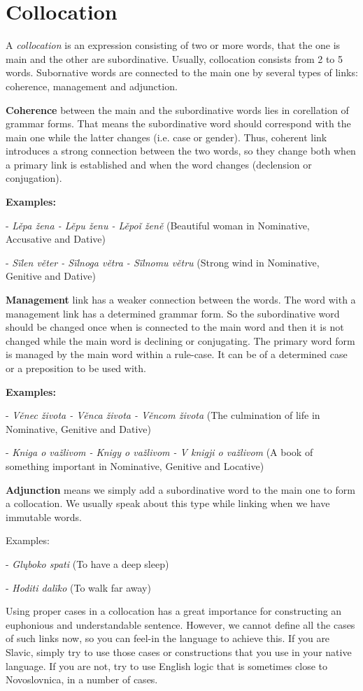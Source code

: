 \section{Collocation}

A \textit{collocation} is an expression consisting of two or more words, that the one is main and the other are subordinative. Usually, collocation consists from 2 to 5 words. Subornative words are connected to the main one by several types of links: coherence, management and adjunction.

\textbf{Coherence} between the main and the subordinative words lies in corellation of grammar forms. That means the subordinative word should correspond with the main one while the latter changes (i.e. case or gender). Thus, coherent link introduces a strong connection between the two words, so they change both when a primary link is established and when the word changes (declension or conjugation).

\textbf{Examples:}

- \textit{Lěpa žena - Lěpu ženu - Lěpoǐ ženě} (Beautiful woman in Nominative, Accusative and Dative)

- \textit{Sïlen věter - Sïlnoga větra - Sïlnomu větru} (Strong wind in Nominative, Genitive and Dative)

\textbf{Management} link has a weaker connection between the words. The word with a management link has a determined grammar form. So the subordinative word should be changed once when is connected to the main word and then it is not changed while the main word is declining or conjugating. The primary word form is managed by the main word within a rule-case. It can be of a determined case or a preposition to be used with.

\textbf{Examples:}

- \textit{Věnec života - Věnca života - Věncom života} (The culmination of life in Nominative, Genitive and Dative)

- \textit{Kniga o važlivom - Knigy o važlivom - V knigji o važlivom} (A book of something important in Nominative, Genitive and Locative)

\textbf{Adjunction} means we simply add a subordinative word to the main one to form a collocation. We usually speak about this type while linking when we have immutable words.

Examples:

- \textit{Glųboko spati} (To have a deep sleep)

- \textit{Hoditi dalïko} (To walk far away)

Using proper cases in a collocation has a great importance for constructing an euphonious and understandable sentence. However, we cannot define all the cases of such links now, so you can feel-in the language to achieve this. If you are Slavic, simply try to use those cases or constructions that you use in your native language. If you are not, try to use English logic that is sometimes close to Novoslovnica, in a number of cases.